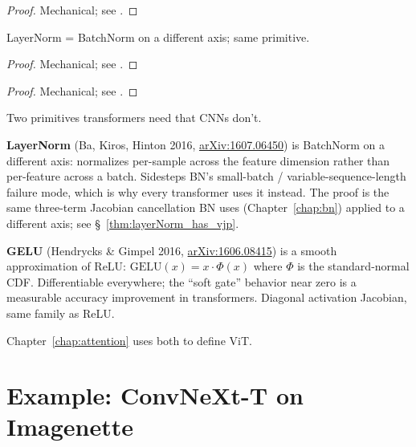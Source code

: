 \begin{proof}
\leanok
Mechanical; see .
\end{proof}

\begin{theorem}
  \label{thm:layerNorm_has_vjp}
  \leanok
  LayerNorm = BatchNorm on a different axis; same primitive.
\end{theorem}

\begin{proof}
\leanok
Mechanical; see .
\end{proof}

\begin{theorem}
  \label{thm:gelu_has_vjp}
  \leanok
\end{theorem}

\begin{proof}
\leanok
Mechanical; see .
\end{proof}

Two primitives transformers need that CNNs don't.

\textbf{LayerNorm} (Ba, Kiros, Hinton 2016,
\href{https://arxiv.org/abs/1607.06450}{arXiv:1607.06450}) is BatchNorm
on a different axis: normalizes per-sample across the feature dimension
rather than per-feature across a batch. Sidesteps BN's small-batch /
variable-sequence-length failure mode, which is why every transformer
uses it instead. The proof is the same three-term Jacobian cancellation
BN uses (Chapter~\ref{chap:bn}) applied to a different axis; see
\S~\ref{thm:layerNorm_has_vjp}.

\textbf{GELU} (Hendrycks \& Gimpel 2016,
\href{https://arxiv.org/abs/1606.08415}{arXiv:1606.08415}) is a smooth
approximation of ReLU: $\mathrm{GELU}(x) = x \cdot \Phi(x)$ where
$\Phi$ is the standard-normal CDF. Differentiable everywhere; the
``soft gate'' behavior near zero is a measurable accuracy improvement
in transformers. Diagonal activation Jacobian, same family as ReLU.

Chapter~\ref{chap:attention} uses both to define ViT.

\section{Example: ConvNeXt-T on Imagenette}
\label{sec:convnext_example}

